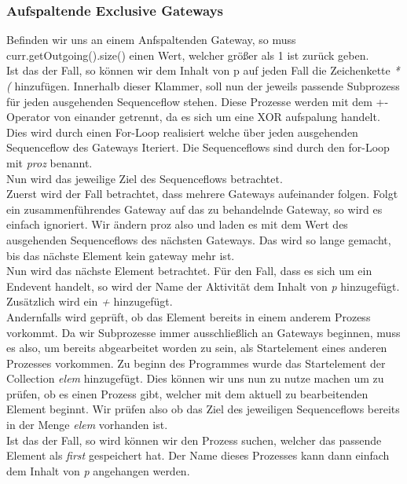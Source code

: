 \subsubsection{Aufspaltende Exclusive Gateways}\label{Aufspaltende Exclusive Gateways}
Befinden wir uns an einem Anfspaltenden Gateway, so muss curr.getOutgoing().size() einen Wert, welcher größer als 1 ist zurück geben.\\
Ist das der Fall, so können wir dem Inhalt von p auf jeden Fall die Zeichenkette \textit{*(} hinzufügen. Innerhalb dieser Klammer, soll nun der jeweils passende Subprozess für jeden ausgehenden Sequenceflow stehen. Diese Prozesse werden mit dem +-Operator von einander getrennt, da es sich um eine XOR aufspalung handelt.\\
Dies wird durch einen For-Loop realisiert welche über jeden ausgehenden Sequenceflow des Gateways Iteriert. Die Sequenceflows sind durch den for-Loop mit \textit{proz} benannt.\\
Nun wird das jeweilige Ziel des Sequenceflows betrachtet.\\
Zuerst wird der Fall betrachtet, dass mehrere Gateways aufeinander folgen. Folgt ein zusammenführendes Gateway auf das zu behandelnde Gateway, so wird es einfach ignoriert. Wir ändern proz also und laden es mit dem Wert des ausgehenden Sequenceflows des nächsten Gateways. Das wird so lange gemacht, bis das nächste Element kein gateway mehr ist.\\
Nun wird das nächste Element betrachtet.
Für den Fall, dass es sich um ein Endevent handelt, so wird der Name der Aktivität dem Inhalt von \textit{p} hinzugefügt. Zusätzlich wird ein \textit{+} hinzugefügt.\\
Andernfalls wird geprüft, ob das Element bereits in einem anderem Prozess vorkommt. Da wir Subprozesse immer ausschließlich an Gateways beginnen, muss es also, um bereits abgearbeitet worden zu sein, als Startelement eines anderen Prozesses vorkommen. Zu beginn des Programmes wurde das Startelement der Collection \textit{elem} hinzugefügt. Dies können wir uns nun zu nutze machen um zu prüfen, ob es einen Prozess gibt, welcher mit dem aktuell zu bearbeitenden Element beginnt. Wir prüfen also ob das Ziel des jeweiligen Sequenceflows bereits in der Menge \textit{elem} vorhanden ist.\\
Ist das der Fall, so wird können wir den Prozess suchen, welcher das passende Element als \textit{first} gespeichert hat. Der Name dieses Prozesses kann dann einfach dem Inhalt von \textit{p} angehangen werden.\\
